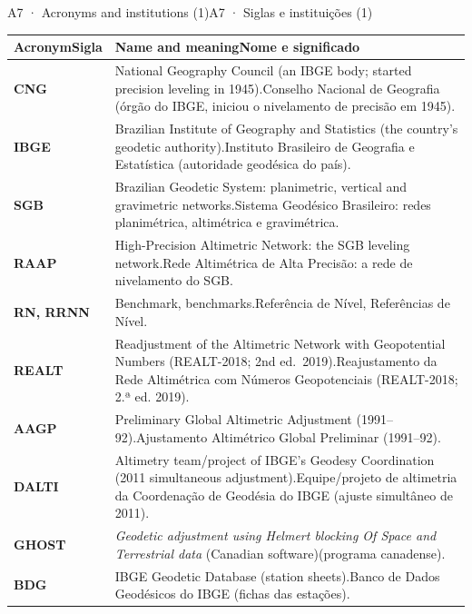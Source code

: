 \documentclass[aspectratio=169,11pt]{beamer}
\newcommand{\tr}[2]{\ifEN#2\else#1\fi}
\begin{document}
\begin{frame}{\tr{A7 · Siglas e instituições (1)}{A7 · Acronyms and institutions (1)}}
  \scriptsize
  \renewcommand{\arraystretch}{1.2}
  \begin{tabular}{@{}lL{11.4cm}@{}}
    \toprule
    \textbf{\tr{Sigla}{Acronym}} & \textbf{\tr{Nome e significado}{Name and meaning}} \\
    \midrule
    \textbf{CNG} & \tr{Conselho Nacional de Geografia (órgão do IBGE, iniciou o nivelamento de precisão em 1945).}{National Geography Council (an IBGE body; started precision leveling in 1945).} \\
    \textbf{IBGE} & \tr{Instituto Brasileiro de Geografia e Estatística (autoridade geodésica do país).}{Brazilian Institute of Geography and Statistics (the country's geodetic authority).} \\
    \textbf{SGB} & \tr{Sistema Geodésico Brasileiro: redes planimétrica, altimétrica e gravimétrica.}{Brazilian Geodetic System: planimetric, vertical and gravimetric networks.} \\
    \textbf{RAAP} & \tr{Rede Altimétrica de Alta Precisão: a rede de nivelamento do SGB.}{High-Precision Altimetric Network: the SGB leveling network.} \\
    \textbf{RN, RRNN} & \tr{Referência de Nível, Referências de Nível.}{Benchmark, benchmarks.} \\
    \textbf{REALT} & \tr{Reajustamento da Rede Altimétrica com Números Geopotenciais (REALT-2018; 2.ª ed. 2019).}{Readjustment of the Altimetric Network with Geopotential Numbers (REALT-2018; 2nd ed.\ 2019).} \\
    \textbf{AAGP} & \tr{Ajustamento Altimétrico Global Preliminar (1991--92).}{Preliminary Global Altimetric Adjustment (1991--92).} \\
    \textbf{DALTI} & \tr{Equipe/projeto de altimetria da Coordenação de Geodésia do IBGE (ajuste simultâneo de 2011).}{Altimetry team/project of IBGE's Geodesy Coordination (2011 simultaneous adjustment).} \\
    \textbf{GHOST} & \emph{Geodetic adjustment using Helmert blocking Of Space and Terrestrial data} \tr{(programa canadense)}{(Canadian software)}. \\
    \textbf{BDG} & \tr{Banco de Dados Geodésicos do IBGE (fichas das estações).}{IBGE Geodetic Database (station sheets).} \\
    \bottomrule
  \end{tabular}
\end{frame}
\end{document}

